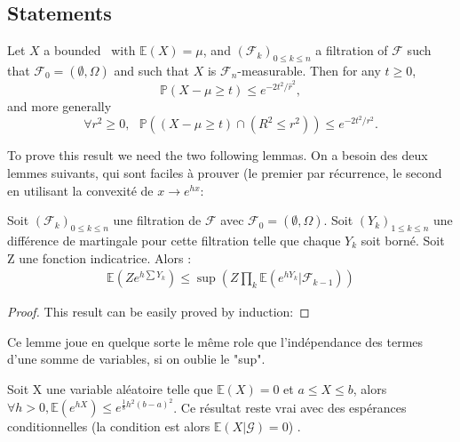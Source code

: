 \subsection{Statements}

\begin{theorem}
\label{3.14}
Let $X$ a bounded \rv~with $\mathbb{E}(X)=\mu$, and $(\mathcal{F}_k)_{0\leq k \leq n}$ a filtration of $\mathcal{F}$ such that $ \mathcal{F}_0 =  (\emptyset , \Omega) $ and such that $X$ is $\mathcal{F}_n$-measurable. 
Then for any $t \geq 0$, $$\mathbb{P}(X-\mu \geq t) \leq e^{-2t^2/\hat r^2},$$ and more generally $$\forall r^2 \geq 0,~~~ \mathbb{P}((X-\mu \geq t)\cap(R^2 \leq r^2)) \leq e^{-2t^2/ r^2}.$$
\end{theorem}

To prove this result we need the two following lemmas.
On a besoin des deux lemmes suivants, qui sont faciles à prouver (le premier par récurrence, le second en utilisant la convexité de $x \rightarrow e^{hx}$:


\begin{lemma}
 \label{lemme_mg}
Soit $(\mathcal{F}_k)_{0\leq k \leq n}$ une filtration de $\mathcal{F}$ avec $ \mathcal{F}_0 =  (\emptyset , \Omega) $. Soit $(Y_k)_{1 \leq k \leq n}$ une différence de martingale pour cette filtration telle que chaque $Y_k$ soit borné. Soit Z une fonction indicatrice. Alors :
\begin{eqnarray*} \mathbb{E}(Z e^{h\sum Y_k}) \leq \sup(Z \prod_{k} \mathbb{E}(e^{hY_k}|\mathcal{F}_{k-1} ))
\end{eqnarray*}
\end{lemma}
\begin{proof}
This result can be easily proved by induction:


\end{proof}
\begin{remark} Ce lemme joue en quelque sorte le même role que l'indépendance des termes d'une somme de variables, si on oublie le "sup".
\end{remark}

\begin{lemma} 
 \label{lemme_u}
Soit X une variable aléatoire telle que $\mathbb{E}(X) = 0 $ et $a \leq X \leq b$, alors $ \forall h>0, \mathbb{E}(e^{hX}) \leq e^{\frac{1}{8}h^2(b-a)^2} $.
Ce résultat reste vrai avec des espérances conditionnelles (la condition est alors $ \mathbb{E}(X|\mathcal{G})=0$) .
\end{lemma}

